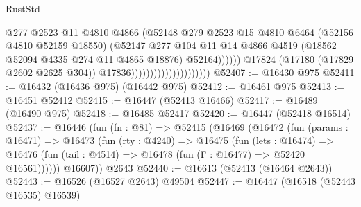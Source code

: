 \begin{lexlean}{RustStd}
\begin{coremodule}
                                                      @277
                                                      @2523
                                                      @11
                                                      @4810
                                                      @4866
                                                      (@52148
                                                        @279
                                                        @2523
                                                        @15
                                                        @4810
                                                        @6464
                                                        (@52156 @4810 @52159 @18550)
                                                        (@52147
                                                          @277
                                                          @104
                                                          @11
                                                          @14
                                                          @4866
                                                          @4519
                                                          (@18562
                                                            @52094
                                                            @4335
                                                            @274
                                                            @11
                                                            @4865
                                                            @18876)
                                                          @52164))))))
                                              @17824
                                              (@17180 (@17829 @2602 @2625 @304))
                                              @17836)))))))))))))))))))))
@52407 := @16430 @975
@52411 := @16432 (@16436 @975) (@16442 @975)
@52412 := @16461 @975
@52413 := @16451 @52412
@52415 := @16447 (@52413 @16466)
@52417 := @16489 (@16490 @975)
@52418 := @16485 @52417
@52420 := @16447 (@52418 @16514)
@52437 := @16446
    (fun (fn : @81) =>
    @52415
      (@16469
        (@16472
          (fun (params : @16471) =>
          @16473
            (fun (rty : @4240) =>
            @16475
              (fun (lets : @16474) =>
              @16476 (fun (tail : @4514) => @16478 (fun (Γ : @16477) => @52420 @16561))))))
        @16607))
    @2643
@52440 := @16613 (@52413 (@16464 @2643))
@52443 := @16526 (@16527 @2643) @49504
@52447 := @16447 (@16518 (@52443 @16535) @16539)

\end{coremodule}
\end{lexlean}
